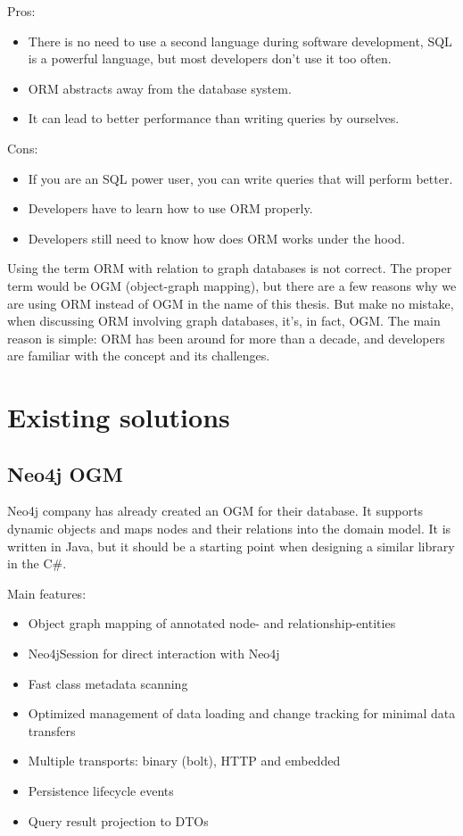 \documentclass[thesis=M,english]{FITthesis}[2019/12/23]
\begin{document}
\noindent Pros:
\begin{itemize}
    \item There is no need to use a second language during software development, SQL is a powerful language, but most developers don't use it too often.
    \item ORM abstracts away from the database system.
    \item It can lead to better performance than writing queries by ourselves.
\end{itemize}
Cons:
\begin{itemize}
    \item If you are an SQL power user, you can write queries that will perform better.
    \item Developers have to learn how to use ORM properly.
    \item Developers still need to know how does ORM works under the hood.
\end{itemize}

Using the term ORM with relation to graph databases is not correct. The proper term would be OGM (object-graph mapping), but there are a few reasons why we are using ORM instead of OGM in the name of this thesis. But make no mistake, when discussing ORM involving graph databases, it's, in fact, OGM. The main reason is simple: ORM has been around for more than a decade, and developers are familiar with the concept and its challenges.

\section {Existing solutions}

\subsection {Neo4j OGM}

Neo4j company has already created an OGM for their database. It supports dynamic objects and maps nodes and their relations into the domain model.
It is written in Java, but it should be a starting point when designing a similar library in the C\#.

\noindent Main features:
\begin{itemize}
    \item Object graph mapping of annotated node- and relationship-entities
    \item Neo4jSession for direct interaction with Neo4j
    \item Fast class metadata scanning
    \item Optimized management of data loading and change tracking for minimal data transfers
    \item Multiple transports: binary (bolt), HTTP and embedded
    \item Persistence lifecycle events
    \item Query result projection to DTOs
\end{itemize}
\end{document}

